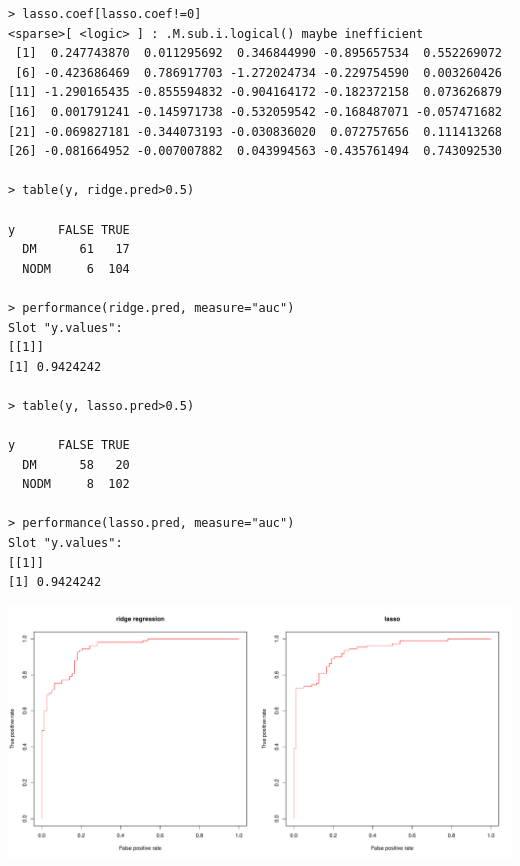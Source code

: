 \documentclass[11pt, a4paper]{article}
\begin{document}
\begin{verbatim}
> lasso.coef[lasso.coef!=0]
<sparse>[ <logic> ] : .M.sub.i.logical() maybe inefficient
 [1]  0.247743870  0.011295692  0.346844990 -0.895657534  0.552269072
 [6] -0.423686469  0.786917703 -1.272024734 -0.229754590  0.003260426
[11] -1.290165435 -0.855594832 -0.904164172 -0.182372158  0.073626879
[16]  0.001791241 -0.145971738 -0.532059542 -0.168487071 -0.057471682
[21] -0.069827181 -0.344073193 -0.030836020  0.072757656  0.111413268
[26] -0.081664952 -0.007007882  0.043994563 -0.435761494  0.743092530

> table(y, ridge.pred>0.5)
      
y      FALSE TRUE
  DM      61   17
  NODM     6  104

> performance(ridge.pred, measure="auc")
Slot "y.values":
[[1]]
[1] 0.9424242

> table(y, lasso.pred>0.5)
      
y      FALSE TRUE
  DM      58   20
  NODM     8  102

> performance(lasso.pred, measure="auc")
Slot "y.values":
[[1]]
[1] 0.9424242
\end{verbatim}

\includegraphics[scale=0.4]{roc-lasso-ridge.pdf}
\end{document}

